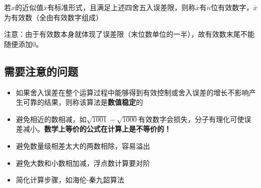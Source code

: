 \begin{definition}[有效数字]
	若$x$的近似值$\bar{x}$有标准形式，且满足上述四舍五入误差限，则称$\bar{x}$有$n$位有效数字，$\bar{x}$为有效数（全由有效数字组成）
\end{definition}
注意：由于有效数本身就体现了误差限（末位数单位的一半），故有效数末尾不能随便添加$0$。

\subsection{需要注意的问题}
\begin{itemize}
	\item 如果舍入误差在整个运算过程中能够得到有效控制或舍入误差的增长不影响产生可靠的结果，则称该算法是\textbf{数值稳定}的
	\item 避免相近的数相减，如$\sqrt{1001}-\sqrt{1000}$有效数字会损失，分子有理化可使误差减小。\textbf{数学上等价的公式在计算上是不等价的！}
	\item 避免数量级相差太大的两数相除，容易溢出
	\item 避免大数和小数相加减，浮点数计算要对阶
	\item 简化计算步骤，如海伦-秦九韶算法
\end{itemize}